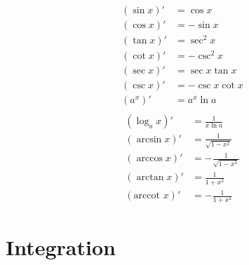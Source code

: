 \begin{multicols}{2}
\begin{equation*}
    \begin{aligned}
        (\sin x)' &= \cos x \\
        (\cos x)' &= - \sin x \\
        (\tan x)' &= \sec^2 x\\
        (\cot x)' &= - \csc^2 x \\
        (\sec x)' &= \sec x \tan x \\
        (\csc x)' &= -\csc x \cot x \\
        (a^x)' &= a^x
         \ln a \\
    \end{aligned}
\end{equation*}
\begin{equation*}
    \begin{aligned}
        (\log_a x)' &= \frac{1}{x \ln a} \\
        (\arcsin x)' &= \frac{1}{\sqrt{1-x^2}} \\
        (\arccos x)' &= -\frac{1}{\sqrt{1-x^2}} \\
        (\arctan x)' &= \frac{1}{1+x^2} \\
        (\text{arccot } x)' &= -\frac{1}{1+x^2}
    \end{aligned}
\end{equation*}
\end{multicols}






\section{Integration}

